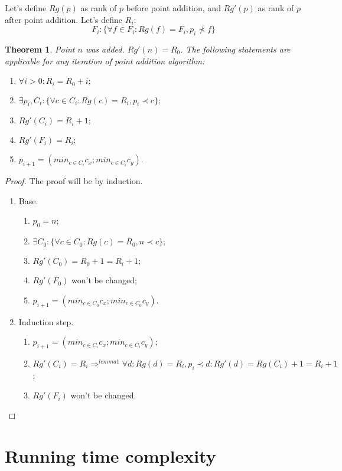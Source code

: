 \documentclass{article}
\newtheorem{th1}{Theorem}
\begin{document}
Let's define $Rg(p)$ as rank of $p$ before point addition, and $Rg'(p)$ as rank
of $p$ after point addition.
Let's define $R_i$:
$$ F_i: \{\forall f \in F_i: Rg(f) = F_i, p_i \not \prec f \}$$

\begin{th1}\label{th1}
Point $n$ was added. $Rg'(n) = R_0$.
The following statements are applicable for any iteration of point addition
algorithm:
\begin{enumerate}
  \item $ \forall i > 0 : R_i = R_0 + i;$
  \item $ \exists p_i, C_i: \{\forall c \in C_i: Rg(c) = R_i, p_i \prec c \};$
  \item $ Rg'(C_i) = R_i + 1;$
  \item $ Rg'(F_i) = R_i;$
  \item $ p_{i+1} = (min_{c \in C_i} c_x; min_{c \in C_i} c_y).$
\end{enumerate}
\end{th1}
\begin{proof}
The proof will be by induction.
\begin{enumerate}
  \item Base.
  \begin{enumerate}
  	\item $p_0 = n;$
  	\item $\exists C_0: \{\forall c \in C_0: Rg(c) = R_0, n \prec c \};$
  	\item $Rg'(C_0) = R_0 + 1 = R_i + 1;$
  	\item $Rg'(F_0)$ won't be changed;
  	\item $p_{i + 1} = (min_{c \in C_0} c_x; min_{c \in C_0} c_y).$
  \end{enumerate}
  \item Induction step.
  \begin{enumerate}
  	\item $ p_{i+1} = (min_{c \in C_i} c_x; min_{c \in C_i} c_y);$
  	\item $ Rg'(C_i) = R_i \Rightarrow^{lemma1} \forall {d: Rg(d) = R_i, p_i
  	\prec d: Rg'(d) = Rg(C_i) + 1 = R_i + 1}$;
  	\item $Rg'(F_i)$ won't be changed.
  \end{enumerate}
\end{enumerate}
\end{proof}

\section{Running time complexity}
\end{document}
